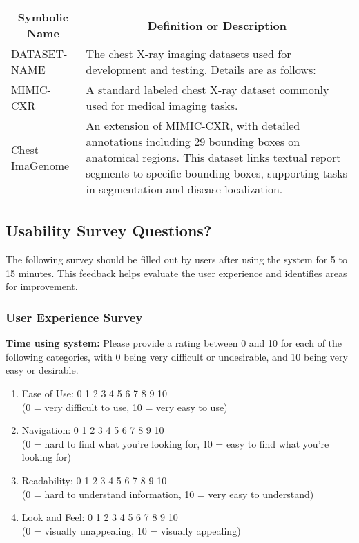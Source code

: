 \documentclass[12pt, titlepage]{article}
\begin{document}
\begin{table}[h]
  \centering
  \begin{tabular}{|p{}|p{}|}
    \hline
    \multicolumn{1}{|c|}{\textbf{Symbolic Name}} & \multicolumn{1}{c|}{\textbf{Definition or Description}} \\ \hline
    DATASET-NAME & The chest X-ray imaging datasets used for development and testing. Details are as follows: \\ \hline
    MIMIC-CXR & A standard labeled chest X-ray dataset commonly used for medical imaging tasks. \\ \hline
    Chest ImaGenome & An extension of MIMIC-CXR, with detailed annotations including 29 bounding boxes on anatomical regions. This dataset links textual report segments to specific bounding boxes, supporting tasks in segmentation and disease localization. \\ \hline
  \end{tabular}
\end{table}

\subsection{Usability Survey Questions?}

The following survey should be filled out by users after using the system for 5 to 15 minutes. This feedback helps evaluate the user experience and identifies areas for improvement.

\subsubsection{User Experience Survey}

\textbf{Time using system:}
Please provide a rating between 0 and 10 for each of the following categories, with 0 being very difficult or undesirable, and 10 being very easy or desirable.
\begin{enumerate}
  \item Ease of Use: 0 1 2 3 4 5 6 7 8 9 10 \\
    (0 = very difficult to use, 10 = very easy to use)
  \item Navigation: 0 1 2 3 4 5 6 7 8 9 10 \\
    (0 = hard to find what you're looking for, 10 = easy to find what you're looking for)
  \item Readability: 0 1 2 3 4 5 6 7 8 9 10 \\
    (0 = hard to understand information, 10 = very easy to understand)
  \item Look and Feel: 0 1 2 3 4 5 6 7 8 9 10 \\
    (0 = visually unappealing, 10 = visually appealing)
\end{enumerate}
\end{document}
